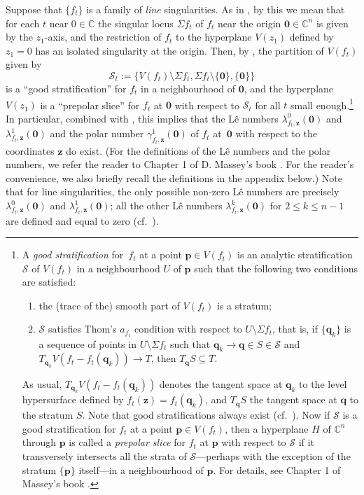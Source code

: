 \documentclass[a4paper,fleqn,11pt]{amsart}
\theoremstyle{definition}
\theoremstyle{remark}
\numberwithin{equation}{section}
\begin{document}
Suppose that $\{f_t\}$ is a family of \emph{line} singularities. As in \cite[\S4]{M7}, by this we mean that for each $t$ near $0\in\mathbb{C}$ the singular locus $\Sigma f_t$ of $f_t$ near the origin $\mathbf{0}\in\mathbb{C}^n$ is given by the $z_1$-axis, and the restriction of $f_t$ to the hyperplane $V(z_1)$ defined by $z_1=0$ has an isolated singularity at the origin. Then, by \cite[Remark 1.29]{M}, the partition of $V(f_t)$ given by
\begin{equation*}
\mathscr{S}_t:=\bigl\{V(f_t)\setminus\Sigma f_t,\Sigma f_t\setminus\{\mathbf{0}\}, \{\mathbf{0}\}\bigr\}
\end{equation*}
is a ``good stratification'' for $f_t$ in a neighbourhood of $\mathbf{0}$, and the hyperplane $V(z_1)$ is a ``prepolar slice'' for $f_t$ at $\mathbf{0}$ with respect to $\mathscr{S}_t$ for all $t$ small enough.\footnote{A \emph{good stratification} for~$f_t$ at a point $\mathbf{p}\in V(f_t)$ is an
analytic stratification $\mathscr{S}$ of $V(f_t)$ in a neighbourhood $U$ of $\mathbf{p}$ such that the following two conditions are satisfied:
\begin{enumerate}
\item the (trace of the) smooth part of $V(f_t)$ is a stratum; 
\item$\mathscr{S}$ satisfies Thom's $a_{f_t}$ condition with respect to $U\setminus \Sigma f_t$, that is, if $\{\mathbf{q}_k\}$ is a sequence of points in $U\setminus \Sigma f_t$ such that $\mathbf{q}_k\rightarrow \mathbf{q}\in S\in\mathscr{S}$ and
$T_{\mathbf{q}_k}V(f_t-f_t(\mathbf{q}_k))\rightarrow T$, then $T_{\mathbf{q}}S\subseteq T$.
\end{enumerate}
As usual, $T_{\mathbf{q}_k} V({f_t-f_t(\mathbf{q}_k)})$ denotes the tangent space at $\mathbf{q}_k$ to the level hypersurface defined by $f_t(\mathbf{z})=f_t(\mathbf{q}_k)$, and $T_{\mathbf{q}}S$ the tangent space at $\mathbf{q}$ to the stratum $S$.
Note that good stratifications always exist (cf.~\cite{HL}).
Now if $\mathscr{S}$ is a good stratification for $f_t$ at a point $\mathbf{p}\in V(f_t)$, then a hyperplane $H$ of $\mathbb{C}^n$ through $\mathbf{p}$ is called a \emph{prepolar slice} for $f_t$ at $\mathbf{p}$ with respect to $\mathscr{S}$ if it transversely intersects all the strata of $\mathscr{S}$---perhaps with the exception of the stratum $\{\mathbf{p}\}$ itself---in a neighbourhood of $\mathbf{p}$. For details, see Chapter 1 of Massey's book \cite{M}.} 
In particular, combined with \cite[Proposition~1.23]{M}, this implies that the L\^e numbers $\lambda^0_{f_t,\mathbf{z}}(\mathbf{0})$ and $\lambda^1_{f_t,\mathbf{z}}(\mathbf{0})$ and the polar number $\gamma^1_{f_t,\mathbf{z}} (\mathbf{0})$
of $f_t$ at~$\mathbf{0}$ with respect to the coordinates $\mathbf{z}$ do exist. (For the definitions of the L\^e numbers and the polar numbers, we refer the reader to Chapter 1 of D. Massey's book \cite{M}. For the reader's convenience, we also briefly recall the definitions in the appendix below.) Note that for line singularities, the only possible non-zero L\^e numbers are precisely $\lambda^0_{f_t,\mathbf{z}}(\mathbf{0})$ and $\lambda^1_{f_t,\mathbf{z}}(\mathbf{0})$; all the other L\^e numbers $\lambda^k_{f_t,\mathbf{z}}(\mathbf{0})$ for $2\leq k\leq n-1$ are defined and equal to zero (cf.~\cite{M}). 
\end{document}
